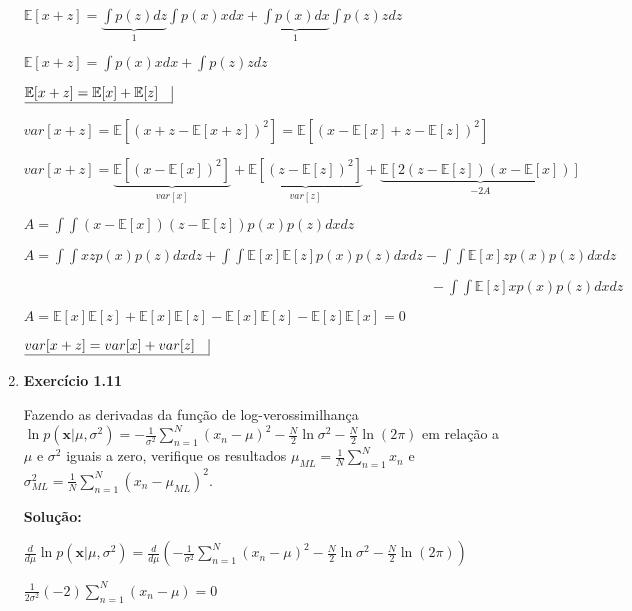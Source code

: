 \begin{enumerate}
    $ \mathbb{E}[x+z] = \displaystyle \underbrace{  \int p(z) dz}_1  \int p(x) x dx  +  \underbrace{\int p(x) dx}_1 \int p(z) z dz $

    $ \mathbb{E}[x+z] = \displaystyle \int p(x) x dx  +  \int p(z) z dz $

    $ \underline{\mathbb{E}[x+z] = \mathbb{E}[x]  +  \mathbb{E}[z] \quad} \vline $

    $ var[x+z] = \mathbb{E}[(x+z-\mathbb{E}[x+z])^2] = \mathbb{E}[(x-\mathbb{E}[x]+z-\mathbb{E}[z])^2]$
    
    $ var[x+z] = \underbrace{\mathbb{E}[(x-\mathbb{E}[x])^2]}_{var[x]}+\underbrace{\mathbb{E}[(z-\mathbb{E}[z])^2]}_{var[z]}+\underbrace{\mathbb{E}[2(z-\mathbb{E}[z])(x-\mathbb{E}[x])]}_{-2A}$
    
    $A = \displaystyle \int \int (x-\mathbb{E}[x]) (z-\mathbb{E}[z]) p(x)p(z) dx dz$
    
    $A = \displaystyle \int \int xz p(x)p(z) dx dz + \int \int \mathbb{E}[x] \mathbb{E}[z] p(x)p(z) dx dz - \int \int \mathbb{E}[x] z p(x)p(z) dx dz $

    $ \quad \quad \quad \quad \quad \quad \quad \quad \quad \quad \quad \quad  \quad \quad \quad \quad \quad \quad \quad \quad \quad \quad \quad \quad  \quad \quad \quad \quad \quad\displaystyle  - \int \int \mathbb{E}[z] x p(x)p(z) dx dz$

    $A=\mathbb{E}[x]\mathbb{E}[z]+\mathbb{E}[x]\mathbb{E}[z]-\mathbb{E}[x]\mathbb{E}[z]-\mathbb{E}[z]\mathbb{E}[x]=0$
  
    $ \underline{var[x+z]=var[x]+var[z] \quad} \vline $
    

\item \textbf{Exercício 1.11} \par

Fazendo as derivadas da função de log-verossimilhança $\ln p (\boldsymbol{x}|\mu, \sigma^2) = -\frac{1}{\sigma^2}\sum_{n=1}^{N}(x_n-\mu)^2-\frac{N}{2}\ln \sigma^2 - \frac{N}{2}\ln (2\pi)$ em relação a $\mu$ e $\sigma^2$ iguais a zero, verifique os resultados $\mu_{ML}=\frac{1}{N}\sum_{n=1}^{N}x_n$ e $\sigma_{ML}^2=\frac{1}{N}\sum_{n=1}^{N}(x_n-\mu_{ML})^2$.
\newline \par
\textbf{Solução:}

    $\frac{d}{d\mu}\ln p (\boldsymbol{x}|\mu, \sigma^2) = \frac{d}{d\mu}\left( -\frac{1}{\sigma^2}\sum_{n=1}^{N}(x_n-\mu)^2-\frac{N}{2}\ln \sigma^2 - \frac{N}{2}\ln (2\pi) \right)$
    
    $\frac{1}{2\sigma^2}(-2)\sum_{n=1}^{N}(x_n-\mu) = 0$
    

\end{enumerate}
